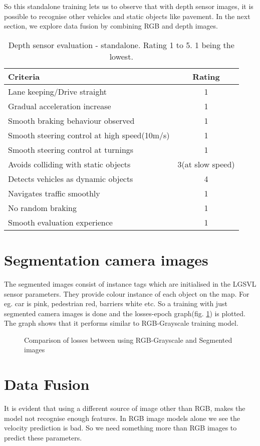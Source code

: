 So this standalone training lets us to observe that with depth sensor images, it is
possible to recognise other vehicles and static objects like pavement. In the next
section, we explore data fusion by combining RGB and depth images.
\begin{table}[!ht]
    \centering
\begin{tabular}{lc}
    \toprule
    Criteria & Rating \\\midrule
    Lane keeping/Drive straight  & 1  \\
    Gradual acceleration increase  & 1\\
    Smooth braking behaviour observed & 1 \\
    Smooth steering control at high speed(10m/s) & 1 \\
    Smooth steering control at turnings & 1\\
    Avoids colliding with static objects & 3(at slow speed) \\
    Detects vehicles as dynamic objects & 4 \\
    Navigates traffic smoothly & 1\\
    No random braking & 1 \\
    Smooth evaluation experience & 1 \\\bottomrule
\end{tabular}
\caption{Depth sensor evaluation - standalone. Rating 1 to 5. 1 being the lowest.}
\label{table:depthsensorstandalone}
\end{table}
\section{Segmentation camera images}
The segmented images consist of instance tags which are initialised in the LGSVL sensor
parameters. They provide colour instance of each object on the map. For eg. car is pink,
pedestrian red, barriers white etc. So a training with just segmented camera images is
done and the losses-epoch graph(fig. \ref{fig:colourvsseg1}) is plotted. The graph shows
that it performs similar to RGB-Grayscale training model.
\begin{figure}[!ht]
    \centering
    \def\svgwidth{\textwidth}
    \caption{Comparison of losses between using RGB-Grayscale and Segmented images}
    \label{fig:colourvsseg1}
\end{figure}
\section{Data Fusion}
It is evident that using a different source of image other than RGB, makes the model not
recognise enough features. In RGB image models alone we see the velocity prediction is bad. So we need
something more than RGB images to predict these parameters.

